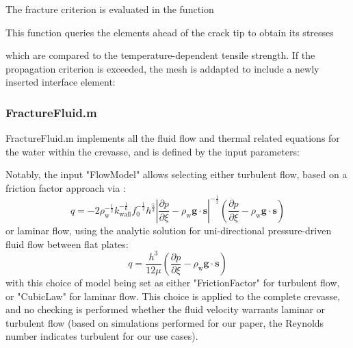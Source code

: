\documentclass[3p]{elsarticle} %
\begin{document}
The fracture criterion is evaluated in the function

This function queries the elements ahead of the crack tip to obtain its stresses

which are compared to the temperature-dependent tensile strength. If the propagation criterion is exceeded, the mesh is addapted to include a newly inserted interface element:


\subsubsection{FractureFluid.m}
FractureFluid.m implements all the fluid flow and thermal related equations for the water within the crevasse, and is defined by the input parameters:

Notably, the input "FlowModel" allows selecting either turbulent flow, based on a friction factor approach via \citep{Gauckler1867, Strickler1981}:
\begin{equation}
    q = -2\rho_{\text{w}}^{-\frac{1}{2}}k_{\text{wall}}^{-\frac{1}{6}}f_0^{-\frac{1}{2}} h^{\frac{5}{3}}\left|\frac{\partial p}{\partial \xi}-\rho_{\text{w}} \mathbf{g} \cdot \mathbf{s}\right|^{-\frac{1}{2}}\left(\frac{\partial p}{\partial \xi}-\rho_{\text{w}} \mathbf{g} \cdot \mathbf{s}\right) \label{eq:qx}
\end{equation}
or laminar flow, using the analytic solution for uni-directional pressure-driven fluid flow between flat plates:
\begin{equation}
	q = \frac{h^3}{12\mu} \left(\frac{\partial p}{\partial \xi}-\rho_{\text{w}} \mathbf{g} \cdot \mathbf{s}\right)
\end{equation}
with this choice of model being set as either "FrictionFactor" for turbulent flow, or "CubicLaw" for laminar flow. This choice is applied to the complete crevasse, and no checking is performed whether the fluid velocity warrants laminar or turbulent flow (based on simulations performed for our paper, the Reynolds number indicates turbulent for our use cases). 
\end{document}

